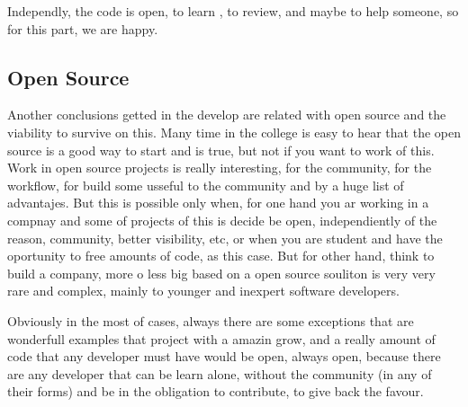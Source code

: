 Independly, the code is open, to learn , to review, and maybe to help someone,
so for this part, we are happy.

\subsection{Open Source}

Another conclusions getted in the develop are related with open source and the
viability to survive on this. Many time in the college is easy to hear that the
open source is a good way to start and is true, but not if you want to work of
this. Work in open source projects is really interesting, for the community,
for the workflow, for build some usseful to the community and by a huge list of
advantajes. But this is possible only when, for one hand you ar working in a
compnay and some of projects of this is decide be open, independiently of the
reason, community, better visibility, etc, or when you are student and have
the oportunity to free amounts of code, as this case. But for other hand,
think to build a company, more o less big based on a open source souliton
is very very rare and complex, mainly to younger and inexpert  software developers.

Obviously in the most of cases, always there are some exceptions that are
wonderfull examples that project with a amazin grow, and a really amount of
code that any developer must have would be open, always open, because there
are any developer that can be learn alone, without the community (in any of their
forms) and be in the obligation to contribute, to give back the favour.
